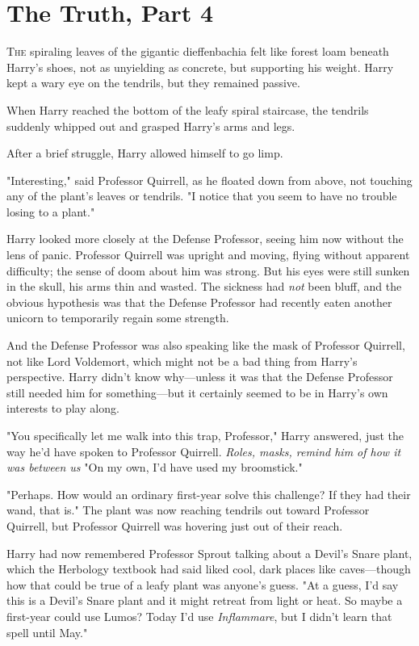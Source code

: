 \chapter{The Truth, Part 4}

\lettrine{T}{he} spiraling
leaves of the gigantic dieffenbachia felt like forest loam beneath Harry's
shoes, not as unyielding as concrete, but supporting his weight. Harry kept a
wary eye on the tendrils, but they remained passive.

When Harry reached the bottom of the leafy spiral staircase, the tendrils
suddenly whipped out and grasped Harry's arms and legs.

After a brief struggle, Harry allowed himself to go limp.

"Interesting," said Professor Quirrell, as he floated down from above, not
touching any of the plant's leaves or tendrils. "I notice that you seem to have
no trouble losing to a plant."

Harry looked more closely at the Defense Professor, seeing him now without the
lens of panic. Professor Quirrell was upright and moving, flying without
apparent difficulty; the sense of doom about him was strong. But his eyes were
still sunken in the skull, his arms thin and wasted. The sickness had
\emph{not} been bluff, and the obvious hypothesis was that the Defense
Professor had recently eaten another unicorn to temporarily regain some
strength.

And the Defense Professor was also speaking like the mask of Professor
Quirrell, not like Lord Voldemort, which might not be a bad thing from Harry's
perspective. Harry didn't know why---unless it was that the Defense Professor
still needed him for something---but it certainly seemed to be in Harry's own
interests to play along.

"You specifically let me walk into this trap, Professor," Harry answered, just
the way he'd have spoken to Professor Quirrell. \emph{Roles, masks, remind him
of how it was between us{\el}} "On my own, I'd have used my broomstick."

"Perhaps. How would an ordinary first-year solve this challenge? If they had
their wand, that is." The plant was now reaching tendrils out toward Professor
Quirrell, but Professor Quirrell was hovering just out of their reach.

Harry had now remembered Professor Sprout talking about a Devil's Snare plant,
which the Herbology textbook had said liked cool, dark places like
caves---though how that could be true of a leafy plant was anyone's guess. "At
a guess, I'd say this is a Devil's Snare plant and it might retreat from light
or heat. So maybe a first-year could use Lumos? Today I'd use
\emph{Inflammare}, but I didn't learn that spell until May."


